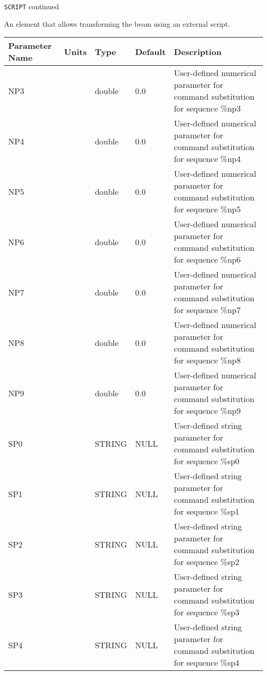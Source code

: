 \newpage
\begin{center}{\Large\verb|SCRIPT| continued}\end{center}
An element that allows transforming the beam using an external script.
\\
\begin{tabular}{|l|l|l|l|p{\descwidth}|} \hline
Parameter Name & Units & Type & Default & Description \\ \hline 
NP3 &  & double &  0.0 & User-defined numerical parameter for command substitution for sequence \%np3  \\ \hline 
NP4 &  & double &  0.0 & User-defined numerical parameter for command substitution for sequence \%np4  \\ \hline 
NP5 &  & double &  0.0 & User-defined numerical parameter for command substitution for sequence \%np5  \\ \hline 
NP6 &  & double &  0.0 & User-defined numerical parameter for command substitution for sequence \%np6  \\ \hline 
NP7 &  & double &  0.0 & User-defined numerical parameter for command substitution for sequence \%np7  \\ \hline 
NP8 &  & double &  0.0 & User-defined numerical parameter for command substitution for sequence \%np8  \\ \hline 
NP9 &  & double &  0.0 & User-defined numerical parameter for command substitution for sequence \%np9  \\ \hline 
SP0 &  & STRING &   NULL            & User-defined string parameter for command substitution for sequence \%sp0  \\ \hline 
SP1 &  & STRING &   NULL            & User-defined string parameter for command substitution for sequence \%sp1  \\ \hline 
SP2 &  & STRING &   NULL            & User-defined string parameter for command substitution for sequence \%sp2  \\ \hline 
SP3 &  & STRING &   NULL            & User-defined string parameter for command substitution for sequence \%sp3  \\ \hline 
SP4 &  & STRING &   NULL            & User-defined string parameter for command substitution for sequence \%sp4  \\ \hline 
\end{tabular}

